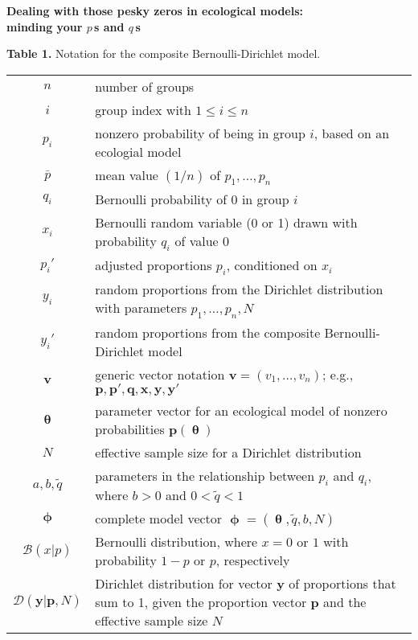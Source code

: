 \documentclass[12pt,fleqn,letterpaper]{article}
\def\myhead{Version 7 -- July 29, 2013}
\def\noi{\noindent}
\def\bfp{\mathbf{p}}
\def\bfpp{\mathbf{p'}}
\def\bfq{\mathbf{q}}
\def\bfv{\mathbf{v}}
\def\bfx{\mathbf{x}}
\def\bfy{\mathbf{y}}
\def\bfyp{\mathbf{y'}}
\def\bfth{\bm{\uptheta}}
\def\bfph{\bm{\upphi}}
\def\Bernou{\mathcal{B}}
\def\Dirich{\mathcal{D}}
\def\pbar{\bar{p}}
\def\qtil{\tilde{q}}
\begin{document}
\pagestyle{myheadings}
  \markright{\myhead}

\begin{center}
  \textbf{
  Dealing with those pesky zeros in ecological models: \\ 
  minding your $p\,$s and $q\,$s}
\end{center}


\noi \textbf{Table 1.} Notation for the composite Bernoulli-Dirichlet model. \\

\noi \begin{tabular}{cp{5.3in}}
\hline
  $n$ & number of groups \\
  $i$ & group index with $1 \leq i \leq n$ \\[2ex]
%
  $p_i$ & nonzero probability of being in group $i$, 
    based on an ecologial model \\
  $\pbar$ & mean value $(1/n)$ of $p_1,\ldots,p_n$ \\
  $q_i$ & Bernoulli probability of 0 in group $i$ \\
  $x_i$ & Bernoulli random variable (0 or 1) drawn with probability $q_i$
    of value 0 \\
  $p_i'$ & adjusted proportions $p_i$, conditioned on $x_i$ \\
  $y_i$ & random proportions from the Dirichlet distribution with parameters
    $p_1,\ldots,p_n,N$ \\
  $y_i'$ & random proportions from the composite Bernoulli-Dirichlet model \\
  $\bfv$ & generic vector notation $\bfv = (v_1,\ldots,v_n)$; e.g., 
    $\bfp,\bfpp,\bfq,\bfx,\bfy,\bfyp$ \\[2ex]
%
  $\bfth$ & parameter vector for an ecological model of nonzero probabilities 
    $\bfp(\bfth)$ \\
  $N$ & effective sample size for a Dirichlet distribution \\
  $a,b,\qtil$ & parameters in the relationship between $p_i$ and $q_i$, 
    where $b>0$ and $0<\qtil<1$ \\
  $\bfph$ & complete model vector $\bfph = (\bfth,\qtil,b,N)$ \\[2ex]
%
  $\Bernou(x|p)$ & Bernoulli distribution, where $x=0 \mbox{ or } 1$ with 
    probability $1-p$ or $p$, respectively \\
  $\Dirich(\bfy|\bfp,N)$ & Dirichlet distribution for vector $\bfy$ of
    proportions that sum to 1, given the proportion vector $\bfp$ and
    the effective sample size $N$ \\

\hline
\end{tabular} \\[3ex]
\end{document}
